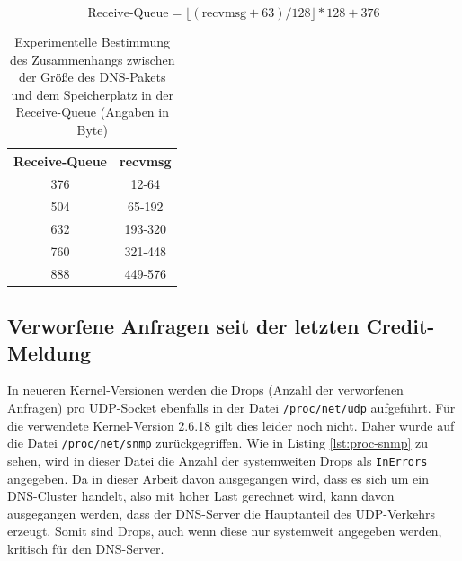 \documentclass[a4paper, 12pt, BCOR10mm, DIV12, toc=bibliography, toc=listof, german]{scrbook}
\begin{document}
		\begin{equation}
			\text{Receive-Queue} = \lfloor (\text{recvmsg} + 63) / 128 \rfloor * 128 + 376	
			\label{eq:recvmsg}
		\end{equation}

		\begin{table}
			\centering
			\begin{tabular}{|c|c|}\hline
				Receive-Queue & recvmsg \\\hline\hline
				376 & 12-64	\\
				504 & 65-192	\\
				632 & 193-320	\\
				760 & 321-448 \\
				888 &	449-576\\\hline
			\end{tabular}
			\caption{Experimentelle Bestimmung des Zusammenhangs zwischen der Größe des DNS-Pakets und dem
			Speicherplatz in der Receive-Queue (Angaben in Byte)}
			\label{tab:recvmsg}
		\end{table}

		


		\subsection*{Verworfene Anfragen seit der letzten Credit-Meldung} %

		In neueren Kernel-Versionen werden die Drops (Anzahl der verworfenen Anfragen) pro UDP-Socket
		ebenfalls in der Datei \texttt{/proc/net/udp} aufgeführt. Für die verwendete Kernel-Version
		2.6.18 gilt dies leider noch nicht. Daher wurde auf die Datei \texttt{/proc/net/snmp}
		zurückgegriffen. Wie in Listing \ref{lst:proc-snmp} zu sehen, wird in dieser Datei die Anzahl
		der systemweiten Drops als \texttt{InErrors} angegeben. Da in dieser Arbeit davon ausgegangen
		wird, dass es sich um ein DNS-Cluster handelt, also mit hoher Last gerechnet wird, kann davon
		ausgegangen werden, dass der DNS-Server die Hauptanteil des UDP-Verkehrs erzeugt. Somit sind
		Drops, auch wenn diese nur systemweit angegeben werden, kritisch für den DNS-Server.
		
		
\end{document}
